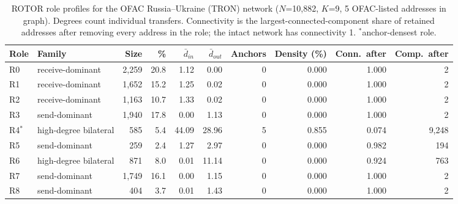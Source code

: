 \begin{table}[htbp]
\centering
\caption{ROTOR role profiles for the OFAC Russia--Ukraine (TRON) network ($N$=10,882, $K$=9, 5 OFAC-listed addresses in graph). Degrees count individual transfers. Connectivity is the largest-connected-component share of retained addresses after removing every address in the role; the intact network has connectivity 1. $^*$anchor-densest role.}
\label{tab:ofac-ru-roles}
\small
\begin{tabular}{llrrrrrrrr}
\toprule
\textbf{Role} & \textbf{Family} & \textbf{Size} & \textbf{\%} & $\bar{d}_{in}$ & $\bar{d}_{out}$ & \textbf{Anchors} & \textbf{Density (\%)} & \textbf{Conn.\ after} & \textbf{Comp.\ after} \\
\midrule
R0 & receive-dominant & 2,259 & 20.8 & 1.12 & 0.00 & 0 & 0.000 & 1.000 & 2 \\
R1 & receive-dominant & 1,652 & 15.2 & 1.25 & 0.02 & 0 & 0.000 & 1.000 & 2 \\
R2 & receive-dominant & 1,163 & 10.7 & 1.33 & 0.02 & 0 & 0.000 & 1.000 & 2 \\
R3 & send-dominant & 1,940 & 17.8 & 0.00 & 1.13 & 0 & 0.000 & 1.000 & 2 \\
R4$^*$ & high-degree bilateral & 585 & 5.4 & 44.09 & 28.96 & 5 & 0.855 & 0.074 & 9,248 \\
R5 & send-dominant & 259 & 2.4 & 1.27 & 2.97 & 0 & 0.000 & 0.982 & 194 \\
R6 & high-degree bilateral & 871 & 8.0 & 0.01 & 11.14 & 0 & 0.000 & 0.924 & 763 \\
R7 & send-dominant & 1,749 & 16.1 & 0.00 & 1.15 & 0 & 0.000 & 1.000 & 2 \\
R8 & send-dominant & 404 & 3.7 & 0.01 & 1.43 & 0 & 0.000 & 1.000 & 2 \\
\bottomrule
\end{tabular}
\end{table}


